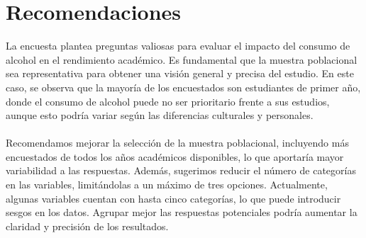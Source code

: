 \documentclass[a4paper,12pt]{article}
\begin{document}
\section{Recomendaciones}

La encuesta plantea preguntas valiosas para evaluar el impacto del consumo de alcohol en el rendimiento académico. Es fundamental que la muestra poblacional sea representativa para obtener una visión general y precisa del estudio. En este caso, se observa que la mayoría de los encuestados son estudiantes de primer año, donde el consumo de alcohol puede no ser prioritario frente a sus estudios, aunque esto podría variar según las diferencias culturales y personales. \\
\\
Recomendamos mejorar la selección de la muestra poblacional, incluyendo más encuestados de todos los años académicos disponibles, lo que aportaría mayor variabilidad a las respuestas. Además, sugerimos reducir el número de categorías en las variables, limitándolas a un máximo de tres opciones. Actualmente, algunas variables cuentan con hasta cinco categorías, lo que puede introducir sesgos en los datos. Agrupar mejor las respuestas potenciales podría aumentar la claridad y precisión de los resultados.

\nocite{*}

\end{document}
